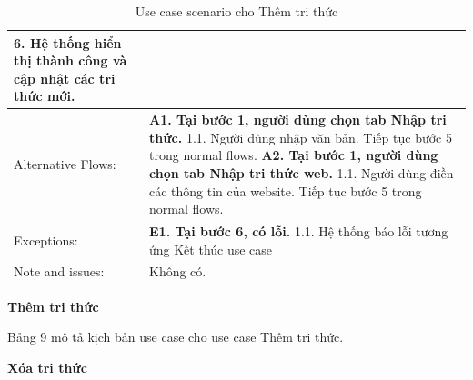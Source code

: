 \begin{table}[H]
\begin{tabular}{|l|l|l|l|}
{            6. Hệ thống hiển thị thành công và cập nhật các tri thức mới.
		} \\ 
		\hline Alternative Flows: & \multicolumn{3}{|p{12cm}|}{ 
			\textbf{A1. Tại bước 1, người dùng chọn tab Nhập tri thức.} \newline 
			\hspace{0.5cm}1.1. Người dùng nhập văn bản. \newline
			\hspace{0.5cm}Tiếp tục bước 5 trong normal flows. \newline
            \textbf{A2. Tại bước 1, người dùng chọn tab Nhập tri thức web.} \newline 
			\hspace{0.5cm}1.1. Người dùng điền các thông tin của website. \newline
            \hspace{0.5cm}Tiếp tục bước 5 trong normal flows. 
		} \\ 
		\hline Exceptions: & \multicolumn{3}{|p{12cm}|}{
            \textbf{E1. Tại bước 6, có lỗi.} \newline 
			\hspace{0.5cm}1.1. Hệ thống báo lỗi tương ứng \newline
            \hspace{0.5cm}Kết thúc use case
        } \\ 
		\hline Note and issues: & \multicolumn{3}{|p{12cm}|}{ Không có. } \\ 
		\hline
	\end{tabular}
	\caption{Use case scenario cho Thêm tri thức}
\end{table}
\textbf{Thêm tri thức}

Bảng 9 mô tả kịch bản use case cho use case Thêm tri thức.

\textbf{Xóa tri thức}

